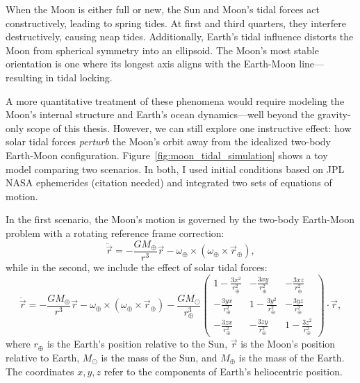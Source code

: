             When the Moon is either full or new, the Sun and Moon's tidal forces act constructively, leading to spring tides. At first and third quarters, they interfere destructively, causing neap tides. Additionally, Earth's tidal influence distorts the Moon from spherical symmetry into an ellipsoid. The Moon's most stable orientation is one where its longest axis aligns with the Earth-Moon line—resulting in tidal locking.

            A more quantitative treatment of these phenomena would require modeling the Moon's internal structure and Earth's ocean dynamics—well beyond the gravity-only scope of this thesis. However, we can still explore one instructive effect: how solar tidal forces \textit{perturb} the Moon's orbit away from the idealized two-body Earth-Moon configuration. Figure~\ref{fig:moon_tidal_simulation} shows a toy model comparing two scenarios. In both, I used initial conditions based on JPL NASA ephemerides (citation needed) and integrated two sets of equations of motion.

            In the first scenario, the Moon's motion is governed by the two-body Earth-Moon problem with a rotating reference frame correction:
            \begin{equation}
                \ddot{\vec{r}} = -\frac{GM_\oplus}{r^3}\vec{r} - \omega_\oplus \times \left(\omega_\oplus \times \vec{r}_\oplus\right),
            \end{equation}
            while in the second, we include the effect of solar tidal forces:
            \begin{equation}
                \ddot{\vec{r}} = -\frac{GM_\oplus}{r^3}\vec{r} - \omega_\oplus \times \left(\omega_\oplus \times \vec{r}_\oplus\right) -\frac{GM_\odot}{r_\oplus^3}
                \left(\begin{matrix}
                    1-\frac{3x^2}{r_\oplus^2} & -\frac{3xy}{r_\oplus^2} & -\frac{3xz}{r_\oplus^2} \\
                    -\frac{3yx}{r_\oplus^2} & 1-\frac{3y^2}{r_\oplus^2} & -\frac{3yz}{r_\oplus^2} \\
                    -\frac{3zx}{r_\oplus^2} & -\frac{3zy}{r_\oplus^2} & 1-\frac{3z^2}{r_\oplus^2}
                \end{matrix}  \right) \cdot \vec{r},
            \end{equation}
            where $r_\oplus$ is the Earth's position relative to the Sun, $\vec{r}$ is the Moon's position relative to Earth, $M_\odot$ is the mass of the Sun, and $M_\oplus$ is the mass of the Earth. The coordinates $x, y, z$ refer to the components of Earth's heliocentric position.

